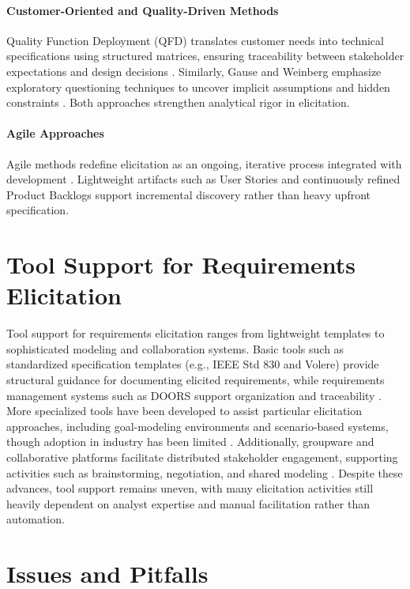 \paragraph{Customer-Oriented and Quality-Driven Methods}

Quality Function Deployment (QFD) translates customer needs into technical specifications using structured matrices, ensuring traceability between stakeholder expectations and design decisions \cite{Akao1995}. Similarly, Gause and Weinberg emphasize exploratory questioning techniques to uncover implicit assumptions and hidden constraints \cite{Gause1989}. Both approaches strengthen analytical rigor in elicitation.

\paragraph{Agile Approaches}

Agile methods redefine elicitation as an ongoing, iterative process integrated with development \cite{Martin2003}. Lightweight artifacts such as User Stories and continuously refined Product Backlogs support incremental discovery rather than heavy upfront specification.

\section{Tool Support for Requirements Elicitation}
Tool support for requirements elicitation ranges from lightweight templates to sophisticated modeling and collaboration systems. Basic tools such as standardized specification templates (e.g., IEEE Std 830 and Volere) provide structural guidance for documenting elicited requirements, while requirements management systems such as DOORS support organization and traceability \cite{IEEE1998,Robertson1999}. More specialized tools have been developed to assist particular elicitation approaches, including goal-modeling environments and scenario-based systems, though adoption in industry has been limited \cite{Reubenstein1991,Goldin1994}. Additionally, groupware and collaborative platforms facilitate distributed stakeholder engagement, supporting activities such as brainstorming, negotiation, and shared modeling \cite{Herlea1998}. Despite these advances, tool support remains uneven, with many elicitation activities still heavily dependent on analyst expertise and manual facilitation rather than automation.

\section{Issues and Pitfalls}

